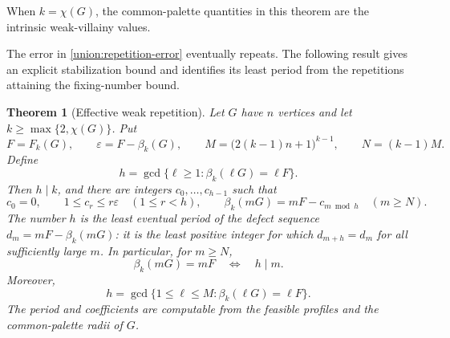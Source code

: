 \documentclass[11pt,reqno]{amsart}
\numberwithin{equation}{section}
\newtheorem{theorem}{Theorem}[section]
\theoremstyle{definition}
\theoremstyle{remark}
\begin{document}
When $k=\chi(G)$, the common-palette quantities in this theorem
are the intrinsic weak-villainy values.

The error in \cref{union:repetition-error} eventually repeats. The
following result gives an explicit stabilization bound and identifies
its least period from the repetitions attaining the fixing-number bound.

\begin{theorem}[Effective weak repetition]\label{union:repetition-stabilization}
\label{union:repetition-periodic}
Let $G$ have $n$ vertices and let $k\ge\max\{2,\chi(G)\}$.
Put
\[
 F=F_k(G),\qquad \varepsilon=F-\beta_k(G),\qquad
 M=\bigl(2(k-1)n+1\bigr)^{k-1},\qquad N=(k-1)M.
\]
Define
\[
 h=\gcd\{\ell\ge1:\beta_k(\ell G)=\ell F\}.
\]
Then $h\mid k$, and there are integers $c_0,\ldots,c_{h-1}$ such that
\[
 c_0=0,\qquad 1\le c_r\le r\varepsilon\quad(1\le r<h),
 \qquad
 \beta_k(mG)=mF-c_{m\bmod h}\quad(m\ge N).
\]
The number $h$ is the least eventual period of the defect sequence
$d_m=mF-\beta_k(mG)$: it is the least positive integer for which
$d_{m+h}=d_m$ for all sufficiently large $m$. In particular, for $m\ge N$,
\[
 \beta_k(mG)=mF\quad\Longleftrightarrow\quad h\mid m.
\]
Moreover,
\[
 h=\gcd\{1\le\ell\le M:\beta_k(\ell G)=\ell F\}.
\]
The period and coefficients are computable from the feasible profiles
and the common-palette radii of $G$.
\end{theorem}
\end{document}

